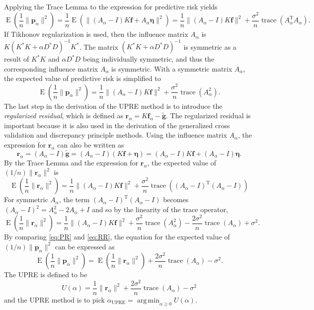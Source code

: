 \documentclass[12pt]{article}
\newcommand{\gnoise}{\widetilde{\mathbf{g}}}
\newcommand{\kmat}{K}	%
\newcommand{\fdis}{\mathbf{f}}
\newcommand{\trans}{\mathrm{T}}	%
\newcommand{\ctrans}{*}	%
\newcommand{\trace}{\operatorname{trace}}	%
\newcommand{\regparam}{\alpha}
\newcommand{\freg}{\fdis_{\regparam}}	%
\DeclareMathOperator*{\argmin}{arg\,min}
\newcommand{\noiseSD}{\sigma}	%
\newcommand{\noise}{\bm{\eta}}	%
\newcommand{\E}{\operatorname{E}}	%
\newcommand{\PE}{\mathbf{p}_{\regparam}}	%
\newcommand{\regres}{\mathbf{r}_{\regparam}}	%
\newcommand{\A}{A_{\regparam}}	%
\newcommand{\U}{U}	%
\begin{document}
\noindent Applying the Trace Lemma to the expression for predictive risk yields
\[\E\left(\frac{1}{n}\|\PE\|^2\right) = \frac{1}{n}\E\left(\|(\A-I)\kmat\fdis + \A\noise\|^2\right) = \frac{1}{n}\|(\A-I)\kmat\fdis\|^2 + \frac{\noiseSD^2}{n}\trace({\A^\trans}\A).\]
If Tikhonov regularization is used, then the influence matrix $\A$ is $\kmat(\kmat^\ctrans\kmat + \regparam{D^\ctrans}D)^{-1}\kmat^\ctrans$. The matrix $(\kmat^\ctrans\kmat + \regparam{D^\ctrans}D)^{-1}$ is symmetric as a result of $\kmat^\ctrans\kmat$ and $\regparam{D^\ctrans}D$ being individually symmetric, and thus the corresponding influence matrix $\A$ is symmetric.  With a symmetric matrix $\A$, the expected value of predictive risk is simplified to
\begin{equation}
\label{eq:PR}
\E\left(\frac{1}{n}\|\PE\|^2\right) = \frac{1}{n}\|(\A-I)\kmat\fdis\|^2 + \frac{\noiseSD^2}{n}\trace(\A^2).
\end{equation}
\indent The last step in the derivation of the UPRE method is to introduce the \textit{regularized residual}, which is defined as $\regres = \kmat\freg - \gnoise$. The regularized residual is important because it is also used in the derivation of the generalized cross validation and discrepancy principle methods. Using the influence matrix $\A$, the expression for $\regres$ can also be written as
\[\regres = (\A-I)\gnoise = (\A-I)(\kmat\fdis + \noise) = (\A-I)\kmat\fdis + (\A-I)\noise.\]
By the Trace Lemma and the expression for $\regres$, the expected value of $(1/n)\|\regres\|^2$ is
\[\E\left(\frac{1}{n}\|\regres\|^2\right) = \frac{1}{n}\|(\A-I)\kmat\fdis\|^2 + \frac{\noiseSD^2}{n}\trace({(\A-I)^\trans}(\A-I))\]
For symmetric $\A$, the term $(\A-I)^\trans(\A-I)$ becomes $(\A-I)^2 = \A^2 - 2\A + I$ and so by the linearity of the trace operator,
\begin{equation}
\label{eq:RR}
\E\left(\frac{1}{n}\|\regres\|^2\right) = \frac{1}{n}\|(\A-I)\kmat\fdis\|^2 + \frac{\noiseSD^2}{n}\trace(\A^2) - \frac{2\noiseSD^2}{n}\trace(\A) + \noiseSD^2.
\end{equation}
By comparing \eqref{eq:PR} and \eqref{eq:RR}, the equation for the expected value of $(1/n)\|\PE\|^2$ can be expressed as
\[\E\left(\frac{1}{n}\|\PE\|^2\right) = \E\left(\frac{1}{n}\|\regres\|^2\right) + \frac{2\noiseSD^2}{n}\trace(\A) - \noiseSD^2.\]
The UPRE is defined to be
\begin{equation}
\label{eq:UPRE}
\U(\regparam) = \frac{1}{n}\|\regres\|^2 + \frac{2\noiseSD^2}{n}\trace(\A) - \noiseSD^2
\end{equation}
and the UPRE method is to pick $\regparam_{\text{UPRE}} = \argmin_{\regparam \geq 0} \U(\regparam)$. \par 
\end{document}
